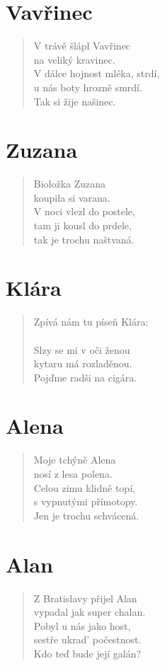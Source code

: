 \section*{Vavřinec}
\begin{verse}
V trávě šlápl Vavřinec\\
na veliký kravinec.\\
V dálce hojnost mléka, strdí,\\
u nás boty hrozně smrdí.\\
Tak si žije našinec.
\end{verse}

\section*{Zuzana}
\begin{verse}
Bioložka Zuzana\\
koupila si varana.\\
V noci vlezl do postele,\\
tam ji kousl do prdele,\\
tak je trochu naštvaná.
\end{verse}

\section*{Klára}
\begin{verse}
Zpívá nám tu píseň Klára:\\
\\
Slzy se mi v oči ženou\\
kytaru má rozladěnou.\\
Pojďme radši na cigára.
\end{verse}

\section*{Alena}
\begin{verse}
Moje tchýně Alena\\
nosí z lesa polena.\\
Celou zimu klidně topí,\\
s vypnutými přímotopy.\\
Jen je trochu schvácená.
\end{verse}

\section*{Alan}
\begin{verse}
Z Bratislavy přijel Alan\\
vypadal jak super chalan.\\
Pobyl u nás jako host,\\
sestře ukrad' počestnost.\\
Kdo teď bude její galán?
\end{verse}

